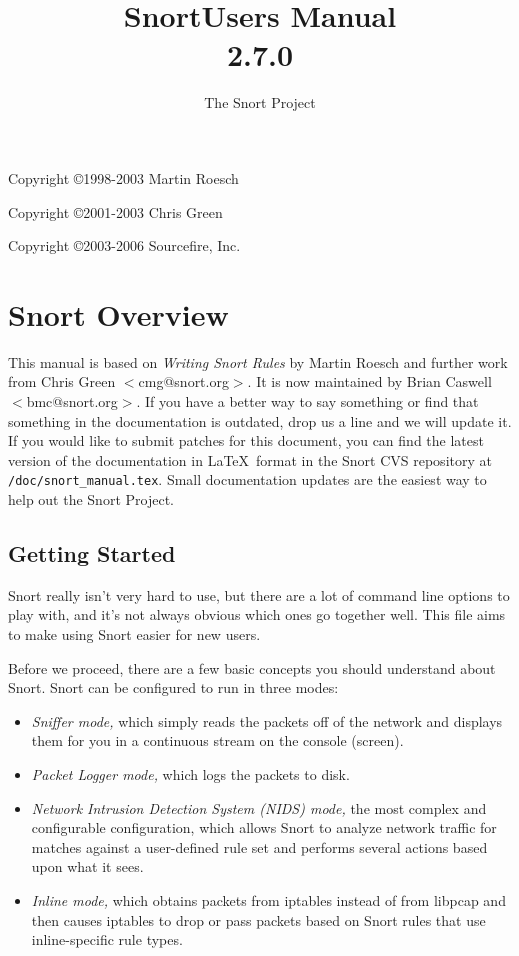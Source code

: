 \documentclass[english]{report}
\begin{document}
\title{Snort\texttrademark  Users Manual\\  2.7.0 }

\author{The Snort Project}

\maketitle

\newpage

Copyright \copyright 1998-2003 Martin Roesch

Copyright \copyright 2001-2003 Chris Green

Copyright \copyright 2003-2006 Sourcefire, Inc.

\tableofcontents{}


\chapter{Snort Overview}

This manual is based on \emph{Writing Snort Rules} by Martin Roesch and further
work from Chris Green $<$cmg@snort.org$>$.  It is now maintained by Brian
Caswell $<$bmc@snort.org$>$.  If you have a better way to say something or find
that something in the documentation is outdated, drop us a line and we will
update it.  If you would like to submit patches for this document, you can find
the latest version of the documentation in \LaTeX\ format in the Snort CVS
repository at \verb!/doc/snort_manual.tex!.  Small documentation updates are
the easiest way to help out the Snort Project.

\section{Getting Started}

Snort really isn't very hard to use, but there are a lot of command line
options to play with, and it's not always obvious which ones go together well.
This file aims to make using Snort easier for new users.

Before we proceed, there are a few basic concepts you should understand about
Snort. Snort can be configured to run in three modes:
\begin{itemize}
\item {\em Sniffer mode,} which simply reads the packets off of the network and displays them 
for you in a continuous stream on the console (screen). 
\item {\em Packet Logger mode,} which logs the packets to disk. 
\item {\em Network Intrusion Detection System (NIDS) mode,} the most complex and configurable configuration,
which allows Snort to analyze network traffic for matches against a user-defined
rule set and performs several actions based upon what it sees.
\item {\em Inline mode,} which obtains packets from iptables instead of from libpcap and then
causes iptables to drop or pass packets based on Snort rules that use inline-specific rule types.
\end{itemize}
\end{document}

